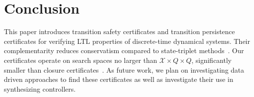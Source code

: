 \section{Conclusion}
\label{sec:conclusion}

This paper introduces transition safety certificates and transition persistence certificates for verifying LTL properties of discrete-time dynamical systems. Their complementarity reduces conservatism compared to state-triplet methods~\cite{wongpiromsarn2015automata}. Our certificates operate on search spaces no larger than $\mathcal{X} \times Q \times Q$, significantly smaller than closure certificates~\cite{murali2024closure}. As future work, we plan on investigating data driven approaches to find these certificates as well as investigate their use in synthesizing controllers.
